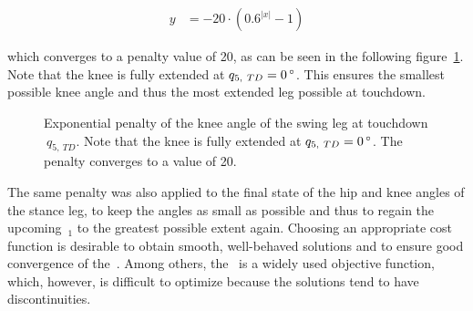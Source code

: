         \begin{align}
            y &= -20 \cdot (0.6^{\vert x \vert} - 1)
            \label{eq:penalty}%
        \end{align}
        
        which converges to a penalty value of 20, as can be seen in the following figure~\ref{fig:penalty}. Note that the knee is fully extended at$~q_{5,~TD} = 0\,\textrm{\si{\degree}}$. This ensures the smallest possible knee angle and thus the most extended leg possible at touchdown. 
        
        \begin{figure}[H]%
            \centering%
            
            \caption{Exponential penalty of the knee angle of the swing leg at touchdown$~q_{5,~TD}$. Note that the knee is fully extended at$~q_{5,~TD} = 0\,\textrm{\si{\degree}}$. The penalty converges to a value of 20.}
            \label{fig:penalty}
        \end{figure}%
        
        The same penalty was also applied to the final state of the hip and knee angles of the stance leg, to keep the angles as small as possible and thus to regain the upcoming~$_1$ to the greatest possible extent again. Choosing an appropriate cost function is desirable to obtain smooth, well-behaved solutions and to ensure good convergence of the~. Among others, the~ is a widely used objective function, which, however, is difficult to optimize because the solutions tend to have discontinuities.~\cite{Kelly2017}
        
        
        
